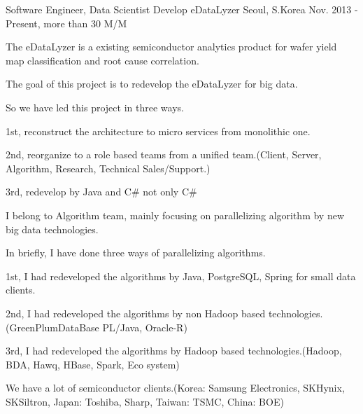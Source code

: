 

\begin{cventries}

  \cventry
    {Software Engineer, Data Scientist} %
    {Develop eDataLyzer} %
    {Seoul, S.Korea} %
    {Nov. 2013 - Present, more than 30 M/M} %
    {
      \begin{cvitems} %
        \item {The eDataLyzer is a existing semiconductor analytics product for wafer yield map classification and root cause correlation.}
        \item {The goal of this project is to redevelop the eDataLyzer for big data.}
        \item {So we have led this project in three ways.}
        \item {1st, reconstruct the architecture to micro services from monolithic one.}
        \item {2nd, reorganize to a role based teams from a unified team.(Client, Server, Algorithm, Research, Technical Sales/Support.)}
        \item {3rd, redevelop by Java and C\# not only C\#}
        \item {I belong to Algorithm team, mainly focusing on parallelizing algorithm by new big data technologies.}
        \item {In briefly, I have done three ways of parallelizing algorithms.}
        \item {1st, I had redeveloped the algorithms by Java, PostgreSQL, Spring for small data clients.}
        \item {2nd, I had redeveloped the algorithms by non Hadoop based technologies.(GreenPlumDataBase PL/Java, Oracle-R)}
        \item {3rd, I had redeveloped the algorithms by Hadoop based technologies.(Hadoop, BDA, Hawq, HBase, Spark, Eco system)}
        \item {We have a lot of semiconductor clients.(Korea: Samsung Electronics, SKHynix, SKSiltron, Japan: Toshiba, Sharp, Taiwan: TSMC, China: BOE)}
      \end{cvitems}
    }


\end{cventries}
